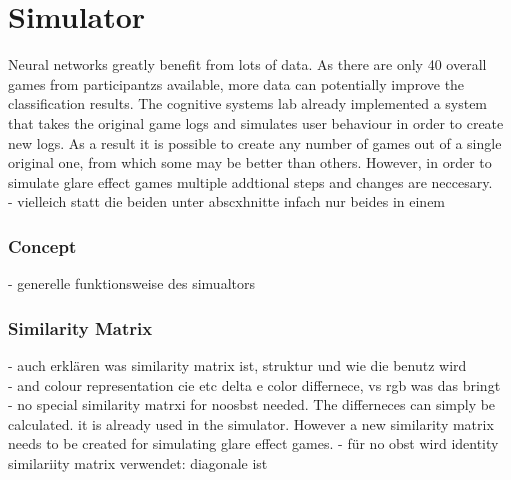 \chapter{Simulator}

Neural networks greatly benefit from lots of data. As there are only 40  overall games from participantzs available, more data can potentially improve the classification results.  The cognitive systems lab already implemented a system that takes the original game logs and simulates user behaviour in order to create new logs. As a result it is possible to create any number of games out of a single original one, from which some may be better than others. However, in order to simulate glare effect games multiple addtional steps and changes are neccesary. \\



- vielleich statt die beiden unter abscxhnitte infach nur beides in einem 
\subsection{Concept}
- generelle funktionsweise des simualtors
\subsection{Similarity Matrix}
- auch erklären was similarity matrix ist, struktur und wie die benutz wird\\
- and colour representation cie etc delta e color differnece, vs rgb was das bringt\\ 
- no special similarity matrxi for noosbst needed. The differneces can simply be calculated. it is already used in the simulator. However a new similarity matrix needs to be created for simulating glare effect games. 
- für no obst wird identity similariity matrix verwendet: diagonale ist 